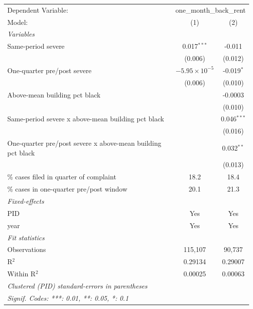 \begingroup
\centering
\begin{tabular}{lcc}
   \tabularnewline \midrule \midrule
   Dependent Variable: & \multicolumn{2}{c}{one\_month\_back\_rent}\\
   Model:                                                      & (1)                    & (2)\\  
   \midrule
   \emph{Variables}\\
   Same-period severe                                          & 0.017$^{***}$          & -0.011\\   
                                                               & (0.006)                & (0.012)\\   
   One-quarter pre/post severe                                 & $-5.95\times 10^{-5}$  & -0.019$^{*}$\\   
                                                               & (0.006)                & (0.010)\\   
   Above-mean building pct black                               &                        & -0.0003\\   
                                                               &                        & (0.010)\\   
   Same-period severe x above-mean building pct black          &                        & 0.046$^{***}$\\   
                                                               &                        & (0.016)\\   
   One-quarter pre/post severe x above-mean building pct black &                        & 0.032$^{**}$\\   
                                                               &                        & (0.013)\\   
   \% cases filed in quarter of complaint                      & 18.2                   & 18.4\\  
   \% cases in one-quarter pre/post window                     & 20.1                   & 21.3\\  
   \midrule
   \emph{Fixed-effects}\\
   PID                                                         & Yes                    & Yes\\  
   year                                                        & Yes                    & Yes\\  
   \midrule
   \emph{Fit statistics}\\
   Observations                                                & 115,107                & 90,737\\  
   R$^2$                                                       & 0.29134                & 0.29007\\  
   Within R$^2$                                                & 0.00025                & 0.00063\\  
   \midrule \midrule
   \multicolumn{3}{l}{\emph{Clustered (PID) standard-errors in parentheses}}\\
   \multicolumn{3}{l}{\emph{Signif. Codes: ***: 0.01, **: 0.05, *: 0.1}}\\
\end{tabular}
\par\endgroup
